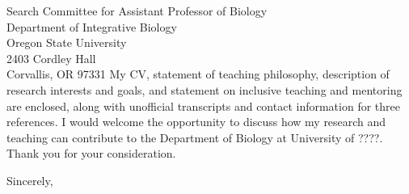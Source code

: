 \documentclass[11pt,letterpaper]{letter}  %
\begin{document}
\begin{letter}{
Search Committee for Assistant Professor of Biology\\
Department of Integrative Biology\\
Oregon State University\\
2403 Cordley Hall\\
Corvallis, OR 97331
}
My CV, statement of teaching philosophy, description of research interests and goals, and statement on inclusive teaching and mentoring are enclosed, along with unofficial transcripts and contact information for three references. I would welcome the opportunity to discuss how my research and teaching can contribute to the Department of Biology at University of ????. Thank you for your consideration.

\closing{Sincerely,}


\end{letter}
\end{document}
